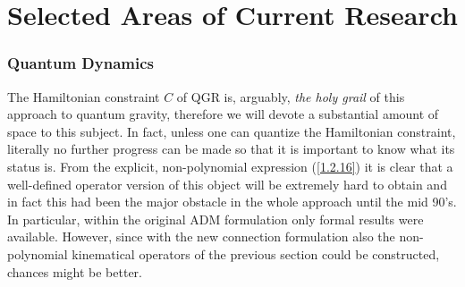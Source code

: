 \documentclass[12pt]{report}
\begin{document}
\part{Selected Areas of Current Research}
\label{s3}

\section{Quantum Dynamics}
\label{s3.1}

The Hamiltonian constraint $C$ of QGR is, arguably, {\it the holy grail}
of this approach to quantum gravity, therefore we will devote a 
substantial amount of space to this subject. In fact, unless one can 
quantize the Hamiltonian constraint, literally no further progress can be 
made so that it is important to know what its status is. From the 
explicit, non-polynomial
expression (\ref{1.2.16}) it is clear that a well-defined operator 
version of this object will be extremely hard to obtain and in fact
this had been the major obstacle in the whole approach until the mid 90's.
In particular, within the original ADM formulation only formal results 
were available. However, since with the new connection formulation also
the non-polynomial kinematical operators of the previous section could be 
constructed, chances might be better. 
\end{document}
